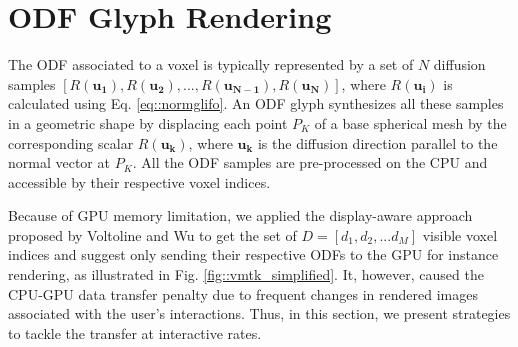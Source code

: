 \documentclass[twoside,twocolumn,10pt]{article}
\begin{document}


 

\section{ODF Glyph Rendering}
\label{sec::odf_glyph_rendering}


The ODF associated to a voxel is typically represented by a set of $N$ diffusion samples $[R(\bm{u_1}), R(\bm{u_2}), ..., R(\bm{u_{N-1}}), R(\bm{u_{N}})]$, where $R(\bm{u_i})$ is calculated using Eq. \ref{eq::normglifo}. An ODF glyph synthesizes all these samples in a geometric shape by displacing each point $P_K$ of a base spherical mesh by the corresponding scalar $R(\bm{u_k})$, where $\bm{u_k}$ is the diffusion direction parallel to the normal vector at $P_K$. All the ODF samples are pre-processed on the CPU and accessible by their respective voxel indices. 

Because of GPU memory limitation, we applied the display-aware approach proposed by Voltoline and Wu \cite{voltoline2021} to get the set of $D = [d_1, d_2, ... d_M]$ visible voxel indices and suggest only sending their respective ODFs to the GPU for instance rendering, as illustrated in Fig. \ref{fig::vmtk_simplified}. It, however, caused the CPU-GPU data transfer penalty due to frequent changes in rendered images associated with the user's interactions. Thus, in this section, we present strategies to tackle the transfer at interactive rates.
\end{document}
